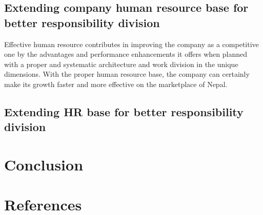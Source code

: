 \documentclass[12pt,a4paper]{scrreprt}
\begin{document}
\section{Extending company human resource base for better responsibility division}
 Effective human resource contributes in improving the company as a competitive one by the advantages and performance enhancements it offers when planned with a proper and systematic architecture and work division in the unique dimensions. With the proper human resource base, the company can certainly make its growth faster and more effective on the marketplace of Nepal.
\section{Extending HR base for better responsibility division}

\chapter{Conclusion}
\chapter*{References}

\end{document}
